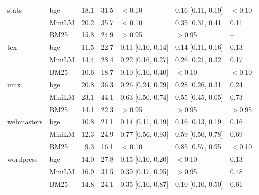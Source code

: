 \begin{tabular}{llrrlll}
stats & bge & 18.1 & 31.5 & $<$0.10 & 0.16 [0.11, 0.19] & $<$0.10\\
 & MiniLM & 20.2 & 35.7 & $<$0.10 & 0.35 [0.31, 0.41] & 0.11\\
 & BM25 & 15.8 & 24.9 & $>$0.95 & $>$0.95 & --\\
\addlinespace[1pt]
tex & bge & 11.5 & 22.7 & 0.11 [0.10, 0.14] & 0.14 [0.11, 0.16] & 0.13\\
 & MiniLM & 14.4 & 28.4 & 0.22 [0.16, 0.27] & 0.26 [0.21, 0.32] & 0.17\\
 & BM25 & 10.6 & 18.7 & 0.10 [0.10, 0.40] & $<$0.10 & $<$0.10\\
\addlinespace[1pt]
unix & bge & 20.8 & 36.3 & 0.26 [0.24, 0.29] & 0.28 [0.26, 0.31] & 0.24\\
 & MiniLM & 23.1 & 44.1 & 0.63 [0.50, 0.74] & 0.55 [0.45, 0.65] & 0.73\\
 & BM25 & 14.1 & 22.3 & $>$0.95 & $>$0.95 & $>$0.95\\
\addlinespace[1pt]
webmasters & bge & 10.8 & 21.1 & 0.14 [0.11, 0.19] & 0.16 [0.13, 0.19] & 0.16\\
 & MiniLM & 12.3 & 24.9 & 0.77 [0.56, 0.93] & 0.59 [0.50, 0.78] & 0.69\\
 & BM25 & 9.3 & 16.1 & $<$0.10 & 0.85 [0.57, 0.95] & $<$0.10\\
\addlinespace[1pt]
wordpress & bge & 14.0 & 27.8 & 0.15 [0.10, 0.20] & $<$0.10 & 0.13\\
 & MiniLM & 16.9 & 31.5 & 0.39 [0.17, 0.95] & $>$0.95 & 0.48\\
 & BM25 & 14.8 & 24.1 & 0.35 [0.10, 0.87] & 0.10 [0.10, 0.50] & 0.61\\
\bottomrule\end{tabular}